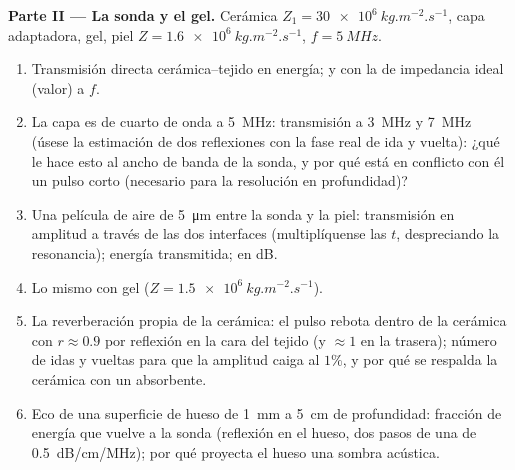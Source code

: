 \begin{problem}
\medskip
\noindent\textbf{Parte II --- La sonda y el gel.}
Cerámica $Z_1 = \qty{30e6}{kg.m^{-2}.s^{-1}}$, capa adaptadora, gel, piel $Z =
\qty{1.6e6}{kg.m^{-2}.s^{-1}}$, $f = \qty{5}{MHz}$.
\begin{enumerate}[resume]
  \item Transmisión directa cerámica--tejido en energía; y con la
         de impedancia ideal (valor) a $f$.
  \item La capa es de cuarto de onda a \qty{5}{MHz}: transmisión
        a \qty{3}{MHz} y \qty{7}{MHz} (úsese la estimación de dos reflexiones
        con la fase real de ida y vuelta): ¿qué le hace esto al
        ancho de banda de la sonda, y por qué está en conflicto con él un pulso corto
        (necesario para la resolución en profundidad)?
  \item Una película de aire de \qty{5}{\micro m} entre la sonda y la piel: transmisión
        en amplitud a través de las dos interfaces (multiplíquense las $t$,
        despreciando la resonancia); energía transmitida; en dB.
  \item Lo mismo con gel ($Z = \qty{1.5e6}{kg.m^{-2}.s^{-1}}$).
  \item La reverberación propia de la cerámica: el pulso rebota dentro de
        la cerámica con $r \approx 0.9$ por reflexión en la cara del tejido
        (y $\approx 1$ en la trasera); número de idas y vueltas para que la
        amplitud caiga al $1\%$, y por qué se respalda la cerámica con
        un absorbente.
  \item Eco de una superficie de hueso de \qty{1}{mm} a \qty{5}{cm} de profundidad: fracción
        de energía que vuelve a la sonda (reflexión en el hueso, dos
        pasos de una  de \qty{0.5}{dB/cm/MHz}); por qué proyecta el hueso una
        sombra acústica.
\end{enumerate}


\end{problem}
